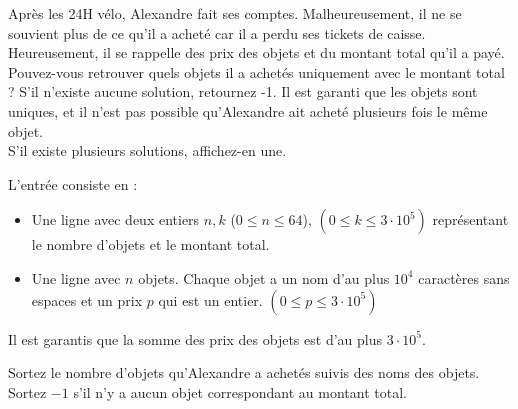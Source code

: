 \problemname{\problemyamlname}

\newcommand{\maxk}{3 \cdot 10^5}
\newcommand{\maxn}{64}

Après les 24H vélo, Alexandre fait ses comptes. Malheureusement, il ne se souvient plus de ce qu'il a acheté car il a perdu ses tickets de caisse. Heureusement, il se rappelle des prix des objets et du montant total qu'il a payé. Pouvez-vous retrouver quels objets il a achetés uniquement avec le montant total ? S'il n'existe aucune solution, retournez -1. Il est garanti que les objets sont uniques, et il n'est pas possible qu'Alexandre ait acheté plusieurs fois le même objet. \\
S'il existe plusieurs solutions, affichez-en une.

\begin{Input}
    L'entrée consiste en :
    \begin{itemize}
        \item Une ligne avec deux entiers $n, k$ ($0 \leq n \leq \maxn$), $(0 \leq k \leq \maxk)$ représentant le nombre d'objets et le montant total.
        \item Une ligne avec $n$ objets. Chaque objet a un nom d'au plus $10^4$ caractères sans espaces et un prix $p$ qui est un entier. $(0 \leq p \leq \maxk)$
    \end{itemize}
    Il est garantis que la somme des prix des objets est d'au plus $\maxk$.
\end{Input}

\begin{Output}
    Sortez le nombre d'objets qu'Alexandre a achetés suivis des noms des objets. Sortez $-1$ s'il n'y a aucun objet correspondant au montant total.
\end{Output}
